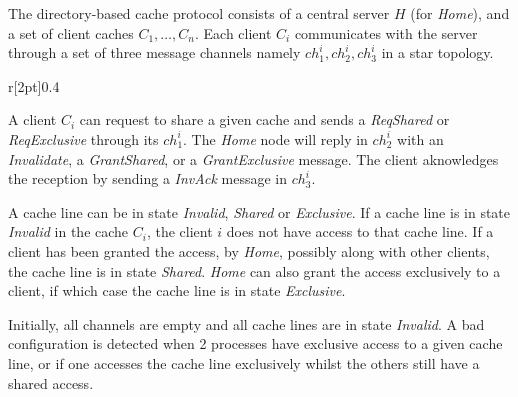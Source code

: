The directory-based cache protocol consists of a central server $H$
(for \emph{Home}), and a set of client caches $C_1,\ldots,C_n$. Each
client $C_i$ communicates with the server through a set of three
message channels namely $ch_1^i,ch_2^i,ch_3^i$ in a star
topology.%

\begin{wrapfigure}{r}[2pt]{0.4\textwidth}
  \hfill
\end{wrapfigure}
A client $C_i$ can request to share a given cache and sends a
\emph{ReqShared} or \emph{ReqExclusive} through its $ch_1^i$. The
\emph{Home} node will reply in $ch_2^i$ with an \emph{Invalidate}, a
\emph{GrantShared}, or a \emph{GrantExclusive} message. The client
aknowledges the reception by sending a \emph{InvAck} message in
$ch_3^i$.

A cache line can be in state \emph{Invalid}, \emph{Shared} or
\emph{Exclusive}. If a cache line is in state \emph{Invalid} in the
cache $C_i$, the client $i$ does not have access to that cache line.
If a client has been granted the access, by \emph{Home}, possibly
along with other clients, the cache line is in state \emph{Shared}.
\emph{Home} can also grant the access exclusively to a client, if
which case the cache line is in state \emph{Exclusive}.

Initially, all channels are empty and all cache lines are in state
\emph{Invalid}. A bad configuration is detected when 2 processes have
exclusive access to a given cache line, or if one accesses the cache
line exclusively whilst the others still have a shared access.

